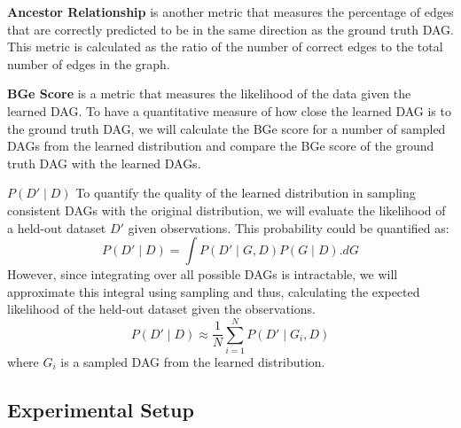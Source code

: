 \documentclass{lxaiproposal}
\begin{document}
    \vspace*{3mm}
    \textbf{Ancestor Relationship} is another metric that measures the percentage of edges that are correctly
    predicted to be in the same direction as the ground truth DAG. This metric is calculated as the ratio of the
    number of correct edges to the total number of edges in the graph.

    \vspace*{3mm}
    \textbf{BGe Score} is a metric that measures the likelihood of the data given the learned DAG. To have a
    quantitative measure of how close the learned DAG is to the ground truth DAG, we will calculate the BGe score
    for a number of sampled DAGs from the learned distribution and compare the BGe score of the ground truth DAG with
    the learned DAGs.

    \vspace*{3mm}
    \textbf{$P(D' \mid D)$} To quantify the quality of the learned distribution in sampling consistent DAGs with the
    original distribution, we will evaluate the likelihood of a held-out dataset $D'$ given observations. This
    probability could be quantified as:
    \begin{equation}
        P(D' \mid D) = \int P(D' \mid G, D) P(G \mid D). dG
        \label{eq:likelihood}
    \end{equation}
    However, since integrating over all possible DAGs is intractable, we will approximate this integral using
    sampling and thus, calculating the expected likelihood of the held-out dataset given the observations.
    \begin{equation}
        P(D' \mid D) \approx \frac{1}{N} \sum_{i=1}^{N} P(D' \mid G_i, D)
        \label{eq:approx_likelihood}
    \end{equation}
    where $G_i$ is a sampled DAG from the learned distribution.

    \subsection{Experimental Setup}\label{sec:experimental_setup}
    \vspace*{-3mm}













    \pagebreak
    
    
\end{document}
